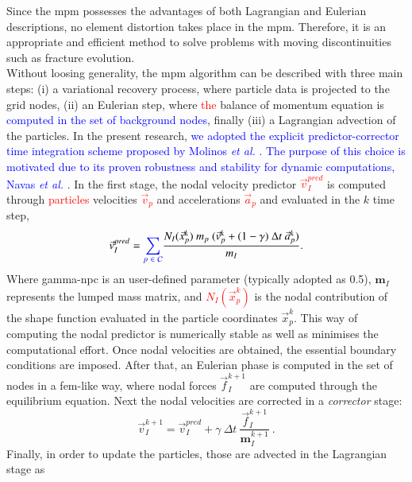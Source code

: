 \documentclass[preprint,12pt,a4paper]{elsarticle}
\newcommand{\tens}[1]{
  \ensuremath{\mathbf{{#1}}}
}
\begin{document}
Since the \acrshort{mpm} possesses the advantages of both Lagrangian and Eulerian descriptions, no  element distortion takes place in the \acrshort{mpm}. Therefore, it is an appropriate and efficient method
to solve problems with moving discontinuities such as fracture evolution.\\
Without loosing generality, the \acrshort{mpm} algorithm
can be described with three main steps: (i) a variational recovery
process, where particle data is projected to the grid nodes, (ii) an
Eulerian step, where \textcolor{red}{the} balance of momentum equation is \textcolor{blue}{computed in the set of background nodes}, finally
(iii) a Lagrangian advection of the particles. In the present research,
\textcolor{blue}{we adopted the explicit predictor-corrector time integration scheme proposed by Molinos {\it et al.} \cite{Molinos2020}. The purpose of this choice is motivated due to its proven robustness and stability for dynamic computations, Navas {\it et al.} \cite{Navas2018a}}. In the first stage, the nodal velocity predictor \textcolor{red}{$ \vec{v}_{I}^{pred}$} is computed through
\textcolor{red}{particles} velocities \textcolor{red}{$\vec{v}_p$} and accelerations \textcolor{red}{$\vec{a}_p$} and evaluated
in the $k$ time step,
\begin{equation}
 \label{eq:Predictor-velocity}
    \vec{v}_{I}^{pred} =  \textcolor{blue}{\sum_{p\ \in\ \mathcal{C}}} \frac{ N_{I}(\vec{x}_p^k )\ m_p\ (\vec{v}_p^k + (1 - \gamma)\ \Delta t\ \vec{a}_p^k)}{m_I}.
\end{equation}
Where \gls{gamma-npc} is an user-defined parameter (typically adopted as
0.5), $\tens{m}_I$ represents the lumped mass matrix, and \textcolor{red}{$N_{I}(\vec{x}_p^k) $} is the nodal contribution of the shape function evaluated in the particle
coordinates $\vec{x}_p^k$. This way of computing the nodal predictor is numerically stable
as well as minimises the computational effort. Once nodal velocities are
obtained, the essential boundary conditions are imposed. After that, an
Eulerian phase is computed in the set of nodes in a
\acrshort{fem}-like way, where nodal forces $\vec{f}_{I}^{k+1}$ are
computed through the equilibrium equation. Next the nodal velocities
are corrected in a \textit{corrector} stage:
\begin{equation}
  \label{eq:Corrector-velocity}
  \vec{v}_{I}^{k+1} = \vec{v}_{I}^{pred} + \gamma\ \Delta t\
  \frac{\vec{f}_{I}^{k+1}}{\tens{m}_I^{k+1}}\ .
\end{equation}
Finally, in order to update the particles, those are advected in the Lagrangian stage as
\end{document}
